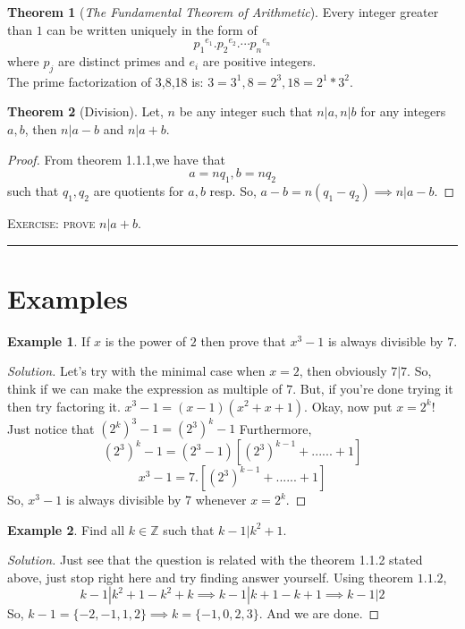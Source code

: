 \documentclass[a4paper,oneside,12 pt]{book}
\theoremstyle{definition}
\newtheorem{exmp}{Example}[section]
\theoremstyle{definition}
\theoremstyle{definition}
\newtheorem{theorem}{Theorem} [section]
\begin{document}
\begin{theorem} [\textit{The Fundamental Theorem of Arithmetic}]

Every integer greater than $1$ can be written uniquely in the form of $${p_1}^{e_1}.{p_2}^{e_2}.\cdots {p_n}^{e_n}$$ where $p_j$ are distinct primes and $e_i$ are positive integers.\\
\textsf{The prime factorization of 3,8,18 is: $3=3^1, 8=2^3, 18=2^1*3^2$. }

\end{theorem}

\begin{theorem} [Division]
Let, $n$ be any integer such that $n|a, n|b$ for any integers $a,b$, then $n|a-b$ and $n|a+b$.
\begin{proof}
From theorem 1.1.1,we have that 
$$a=nq_1, b=nq_2$$
such that $q_1,q_2$ are quotients for $a,b$ resp.
So, $a-b=n(q_1-q_2) \implies n|a-b$.

\end{proof}
\textsc{Exercise: prove $n|a+b$.}
\end{theorem}
 

\rule{\textwidth}{2pt}
\section{Examples}
\begin{exmp}
 If $x$ is the power of $2$ then prove that $x^3-1$ is always divisible by $7$.
\begin{proof}[Solution]
Let's try with the minimal case when $x=2$, then obviously $7|7$. So, think if we can make the expression as multiple of $7$.
But, if you're done trying it then try factoring it. $x^3-1=(x-1)(x^2+x+1)$.
 Okay, now put $x=2^k$! \\
Just notice that $(2^k)^3-1=(2^3)^k-1$
 Furthermore, $$(2^3)^k-1=(2^3-1)[(2^3)^{k-1}+......+1]$$
$$x^3-1=7.[(2^3)^{k-1}+......+1]$$
So, $x^3-1$ is always divisible by 7 whenever $x=2^k$.
\end{proof}
\end{exmp}

\begin{exmp}
Find all $k \in \mathbb{Z}$ such that $k-1|k^2+1$.
\begin{proof} [Solution]
Just see that the question is related with the theorem 1.1.2 stated above, just stop right here and try finding answer yourself.
Using theorem $1.1.2$,
$$k-1|k^2+1-k^2+k \implies k-1|k+1-k+1 \implies k-1|2$$
So, $k-1=\{-2,-1,1,2\} \implies k=\{-1,0,2,3\}$.
And we are done.
\end{proof}
\end{exmp}
\end{document}
